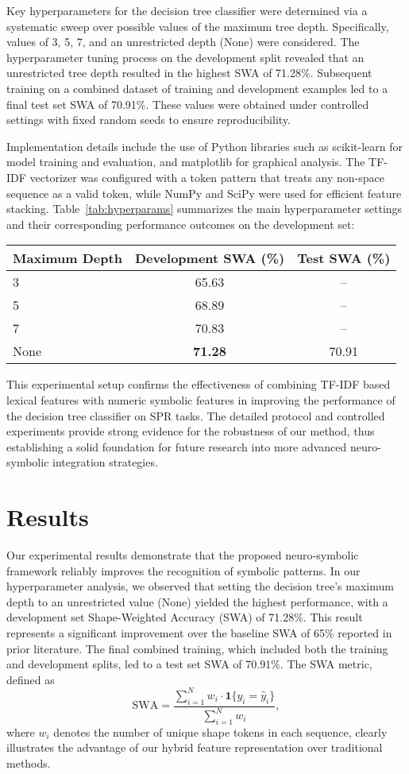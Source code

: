 \documentclass{article}
\begin{document}
Key hyperparameters for the decision tree classifier were determined via a systematic sweep over possible values of the maximum tree depth. Specifically, values of 3, 5, 7, and an unrestricted depth (None) were considered. The hyperparameter tuning process on the development split revealed that an unrestricted tree depth resulted in the highest SWA of 71.28\%. Subsequent training on a combined dataset of training and development examples led to a final test set SWA of 70.91\%. These values were obtained under controlled settings with fixed random seeds to ensure reproducibility.

Implementation details include the use of Python libraries such as scikit-learn for model training and evaluation, and matplotlib for graphical analysis. The TF-IDF vectorizer was configured with a token pattern that treats any non-space sequence as a valid token, while NumPy and SciPy were used for efficient feature stacking. Table~\ref{tab:hyperparams} summarizes the main hyperparameter settings and their corresponding performance outcomes on the development set:

\begin{center}
\begin{tabular}{lcc}
\hline
Maximum Depth & Development SWA (\%) & Test SWA (\%) \\
\hline
3    & 65.63    & -- \\
5    & 68.89    & -- \\
7    & 70.83    & -- \\
None & \textbf{71.28} & 70.91 \\
\hline
\end{tabular}
\end{center}

This experimental setup confirms the effectiveness of combining TF-IDF based lexical features with numeric symbolic features in improving the performance of the decision tree classifier on SPR tasks. The detailed protocol and controlled experiments provide strong evidence for the robustness of our method, thus establishing a solid foundation for future research into more advanced neuro-symbolic integration strategies.

\section{Results}
Our experimental results demonstrate that the proposed neuro‐symbolic framework reliably improves the recognition of symbolic patterns. In our hyperparameter analysis, we observed that setting the decision tree’s maximum depth to an unrestricted value (None) yielded the highest performance, with a development set Shape-Weighted Accuracy (SWA) of 71.28\%. This result represents a significant improvement over the baseline SWA of 65\% reported in prior literature. The final combined training, which included both the training and development splits, led to a test set SWA of 70.91\%. The SWA metric, defined as 
\[
\text{SWA} = \frac{\sum_{i=1}^{N} w_i \cdot \mathbf{1}\{y_i = \hat{y}_i\}}{\sum_{i=1}^{N} w_i},
\]
where \(w_i\) denotes the number of unique shape tokens in each sequence, clearly illustrates the advantage of our hybrid feature representation over traditional methods.
\end{document}
